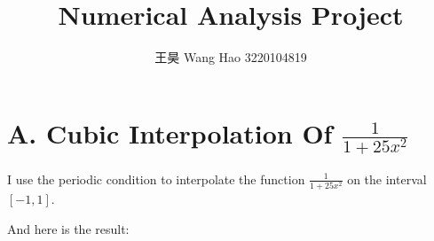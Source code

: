 \documentclass[a4paper]{article}
\begin{document}
\title{Numerical Analysis Project}

\author{王昊 Wang Hao 3220104819}

\maketitle

\tableofcontents
\newpage

\section{A. Cubic Interpolation Of $\frac{1}{1+25x^2}$}
I use the periodic condition to interpolate the function $\frac{1}{1+25x^2}$ on the interval $[-1,1]$.

And here is the result:
\end{document}
